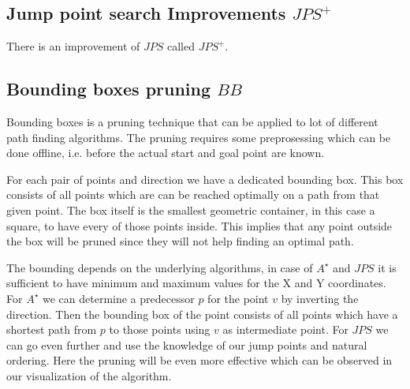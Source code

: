 \documentclass{article}
\begin{document}
    
    
    \subsection{Jump point search Improvements $JPS^+$}
    
    There is an improvement of $JPS$ called $JPS^+$. \cite{DBLP:conf/aips/HaraborG14}
    
    
    
    \subsection{Bounding boxes pruning $BB$}
    
    Bounding boxes is a pruning technique that can be applied to lot of different path finding algorithms. \cite{DBLP:conf/aaai/RabinS16} The pruning requires some preprosessing which can be done offline, i.e. before the actual start and goal point are known.
    
    For each pair of points and direction we have a dedicated bounding box. This box consists of all points which are can be reached optimally on a path from that given point. The box itself is the smallest geometric container, in this case a square, to have every of those points inside. This implies that any point outside the box will be pruned since they will not help finding an optimal path.
    
    The bounding depends on the underlying algorithms, in case of $A^\star$ and $JPS$ it is sufficient to have minimum and maximum values for the X and Y coordinates. For $A^\star$ we can determine a predecessor $p$ for the point $v$ by inverting the direction. Then the bounding box of the point consists of all points which have a shortest path from $p$ to those points using $v$ as intermediate point. For $JPS$ we can go even further and use the knowledge of our jump points and natural ordering. Here the pruning will be even more effective which can be observed in our visualization of the algorithm.
    
\end{document}

